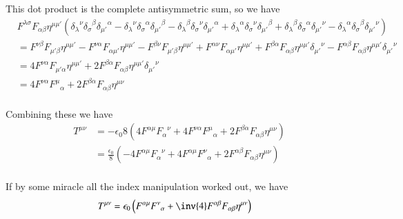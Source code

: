 \documentclass{article}
\begin{document}
This dot product is the complete antisymmetric sum, so we have
\begin{align*}
&
F^{\lambda\sigma} F_{\alpha\beta} 
\eta^{\mu\mu'} 
(
{\delta_\lambda}^\nu {\delta_\sigma}^\beta {\delta_{\mu'}}^\alpha
-{\delta_\lambda}^\nu {\delta_\sigma}^\alpha {\delta_{\mu'}}^\beta
-{\delta_\lambda}^\beta {\delta_\sigma}^\nu {\delta_{\mu'}}^\alpha
+{\delta_\lambda}^\alpha {\delta_\sigma}^\nu {\delta_{\mu'}}^\beta
+{\delta_\lambda}^\beta {\delta_\sigma}^\alpha {\delta_{\mu'}}^\nu
-{\delta_\lambda}^\alpha {\delta_\sigma}^\beta {\delta_{\mu'}}^\nu
) \\
&=
  F^{\nu\beta} F_{{\mu'}\beta} \eta^{\mu\mu'} 
- F^{\nu\alpha} F_{\alpha{\mu'}} \eta^{\mu\mu'}
- F^{\beta\nu} F_{{\mu'}\beta} \eta^{\mu\mu'} 
+ F^{\alpha\nu} F_{\alpha{\mu'}} \eta^{\mu\mu'} 
+ F^{\beta\alpha} F_{\alpha\beta} \eta^{\mu\mu'} {\delta_{\mu'}}^\nu
- F^{\alpha\beta} F_{\alpha\beta} \eta^{\mu\mu'} {\delta_{\mu'}}^\nu
 \\
&=
4 F^{\nu\alpha} F_{{\mu'}\alpha} \eta^{\mu\mu'} 
+ 2 F^{\beta\alpha} F_{\alpha\beta} \eta^{\mu\mu'} {\delta_{\mu'}}^\nu
 \\
&=
4 F^{\nu\alpha} {F^{\mu}}_{\alpha} 
+ 2 F^{\beta\alpha} F_{\alpha\beta} \eta^{\mu\nu} 
 \\
\end{align*}

Combining these we have
\begin{align*}
T^{\mu\nu}
&= 
-{\epsilon_0}{8} \left(
 4 F^{\alpha\mu} {F_{\alpha}}^{\nu} 
+ 4 F^{\nu\alpha} {F^{\mu}}_{\alpha} 
+ 2 F^{\beta\alpha} F_{\alpha\beta} \eta^{\mu\nu} 
\right) \\
&= 
\frac{\epsilon_0}{8} \left(
- 4 F^{\alpha\mu} {F_{\alpha}}^{\nu} 
+ 4 F^{\alpha\mu} {F^{\nu}}_{\alpha}
+ 2 F^{\alpha\beta} F_{\alpha\beta} \eta^{\mu\nu} 
\right) \\
\end{align*}

If by some miracle all the index manipulation worked out, we have
\begin{align}
T^{\mu\nu} &= {\epsilon_0} \left( F^{\alpha\mu} {F^{\nu}}_{\alpha} + \inv{4} F^{\alpha\beta} F_{\alpha\beta} \eta^{\mu\nu} \right)
\end{align}



\end{document}
